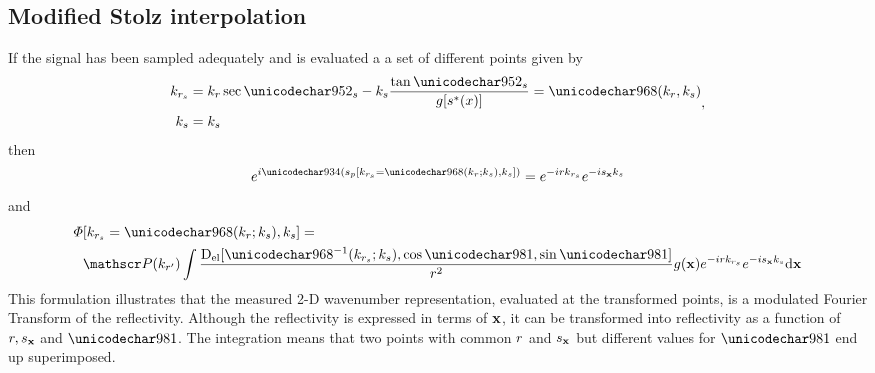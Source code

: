 \subsection{Modified Stolz interpolation}
\label{sc:modifiedStolz}
If the signal has been sampled adequately and is evaluated a a set of different points given by
\begin{equation}
\begin{split}
 \krstolt &= \kr\sec\thetas - \kparm\frac{\tan\thetas}{\gfunc[\myparm(\xang)]} = \stolt(\kr,\kparm)\\
 \kparm &= \kparm
\end{split},
\end{equation}
then
\begin{equation}
 \eex{\im\Phi(\stationaryparm[\krstolt = \stolt(\kr;\kparm),\kparm])} = \eex{-\im\range\krstolt}\eex{ -\im\targetxparm\kparm}
\end{equation}
and
\begin{equation}
\begin{split}
 \vkern&[\krstolt = \stolt(\kr;\kparm),\kparm] = \\&\Snvelope(\krc)\int\frac{\dconstelPattern[\stolt^{-1}(\krstolt;\kparm), \cos\targetdepression, \sin\targetdepression]}{\amplitude\range^2}\reflectivity(\targetnoparm)\eex{-\im\range\krstolt}\eex{ -\im\targetxparm\kparm}\d\targetnoparm
 \end{split}
\end{equation}
This formulation illustrates that the measured 2-D wavenumber representation, evaluated at the transformed points, is a modulated Fourier Transform of the reflectivity. Although the reflectivity is expressed in terms of $\mathbf{\mathbf{x}}$, it can be transformed into reflectivity as a function of $r, s_{\mathbf{x}}$ and $\targetdepression$. The integration means that two points with common $r$ and $s_{\mathbf{x}}$ but different values for $\targetdepression$ end up superimposed.
\par
